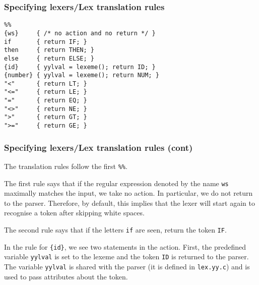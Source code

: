 % 
\begin{frame}[containsverbatim]
\frametitle{Specifying lexers/Lex translation rules}
 
{\small
\begin{verbatim}
%%
{ws}     { /* no action and no return */ }
if       { return IF; }
then     { return THEN; }
else     { return ELSE; }
{id}     { yylval = lexeme(); return ID; }
{number} { yylval = lexeme(); return NUM; }
"<"      { return LT; }
"<="     { return LE; }
"="      { return EQ; }
"<>"     { return NE; }
">"      { return GT; }
">="     { return GE; }
\end{verbatim}
}

\end{frame}

% 
\begin{frame}[containsverbatim]
\frametitle{Specifying lexers/Lex translation rules
(cont)}
 
The translation rules follow the first \verb+%%+.

\bigskip

The first rule says that if the regular expression denoted by the
name \texttt{ws} maximally matches the input, we take no action. In
particular, we do not return to the parser. Therefore, by default,
this implies that the lexer will start again to recognise a token
after skipping white spaces.

\bigskip

The second rule says that if the letters \texttt{if} are seen, return
the token \texttt{IF}.

\bigskip

In the rule for \verb+{id}+, we see two statements in the
action. First, the \Lex predefined variable \texttt{yylval} is set to
the lexeme and the token \texttt{ID} is returned to the parser. The
variable \texttt{yylval} is shared with the parser (it is defined
in \texttt{lex.yy.c}) and is used to pass attributes about the token.

\end{frame}

